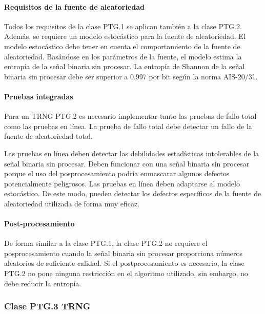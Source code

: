                 \paragraph{Requisitos de la fuente de aleatoriedad\\}
                
                Todos los requisitos de la clase PTG.1 se aplican también a la clase PTG.2. Además, se requiere un modelo estocástico para la fuente de aleatoriedad. El modelo estocástico debe tener en cuenta el comportamiento de la fuente de aleatoriedad. Basándose en los parámetros de la fuente, el modelo estima la entropía de la señal binaria sin procesar. La entropía de Shannon de la señal binaria sin procesar debe ser superior a 0.997 por bit según la norma AIS-20/31.
                
                \paragraph{Pruebas integradas\\}
                
                Para un TRNG PTG.2 es necesario implementar tanto las pruebas de fallo total como las pruebas en línea. La prueba de fallo total debe detectar un fallo de la fuente de aleatoriedad total.

                Las pruebas en línea deben detectar las debilidades estadísticas intolerables de la señal binaria sin procesar. Deben funcionar con una señal binaria sin procesar porque el uso del posprocesamiento podría enmascarar algunos defectos potencialmente peligrosos. Las pruebas en línea deben adaptarse al modelo estocástico. De este modo, pueden detectar los defectos específicos de la fuente de aleatoriedad utilizada de forma muy eficaz.

                \paragraph{Post-procesamiento\\}
                
                De forma similar a la clase PTG.1, la clase PTG.2 no requiere el posprocesamiento cuando la señal binaria sin procesar proporciona números aleatorios de suficiente calidad. Si el postprocesamiento es necesario, la clase PTG.2 no pone ninguna restricción en el algoritmo utilizado, sin embargo, no debe reducir la entropía.

            \subsubsection{Clase PTG.3 TRNG}
            
